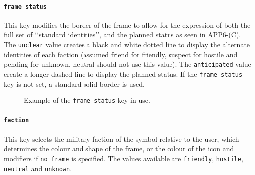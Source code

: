 \documentclass[a4paper, titlepage]{article}
\newcommand\DocLink{\href{https://www.awl.edu.pl/images/en/APP_6_C.pdf}{APP6-(C)}}
\begin{document}
\paragraph{\texttt{frame status}}

This key modifies the border of the frame to allow for the expression of both the full set of \lq\lq{}standard identities\rq\rq{}, and the planned status as seen in \DocLink. The \texttt{unclear} value creates a black and white dotted line to display the alternate identities of each faction (assumed friend for friendly, suspect for hostile and pending for unknown, neutral should not use this value). The \texttt{anticipated} value create a longer dashed line to display the planned status. If the \texttt{frame status} key is not set, a standard solid border is used.

\begin{figure}[H]
\centering
{}
\caption{Example of the \texttt{frame status} key in use.}
\end{figure}


\paragraph{\texttt{faction}}

This key selects the military faction of the symbol relative to the user, which determines the colour and shape of the frame, or the colour of the icon and modifiers if \texttt{no frame} is specified. The values available are \texttt{friendly}, \texttt{hostile}, \texttt{neutral} and \texttt{unknown}.
\end{document}
